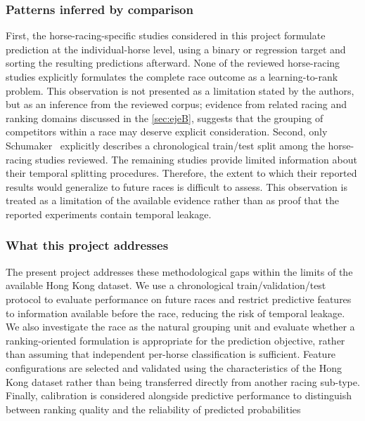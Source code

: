 \subsubsection*{\textbf{Patterns inferred by comparison}} First, the horse-racing-specific studies
considered in this project formulate prediction at the individual-horse level,
using a binary or regression target and sorting the resulting predictions
afterward. None of the reviewed horse-racing studies explicitly formulates the
complete race outcome as a learning-to-rank problem. This observation is not
presented as a limitation stated by the authors, but as an inference from the
reviewed corpus; evidence from related racing and ranking domains discussed in the
\ref{sec:ejeB}, suggests that the grouping of competitors within a race may deserve
explicit consideration. Second, only Schumaker~\cite{ejeA_schumaker2018} explicitly
describes a chronological train/test split among the horse-racing studies reviewed.
The remaining studies provide limited information about their temporal splitting
procedures. Therefore, the extent to which their reported results would generalize
to future races is difficult to assess. This observation is treated as a limitation
of the available evidence rather than as proof that the reported experiments contain
temporal leakage.

\subsubsection*{\textbf{What this project addresses}} The present project addresses these
methodological gaps within the limits of the available Hong Kong dataset. We
use a chronological train/validation/test protocol to evaluate performance on
future races and restrict predictive features to information available before
the race, reducing the risk of temporal leakage. We also investigate the race
as the natural grouping unit and evaluate whether a ranking-oriented
formulation is appropriate for the prediction objective, rather than assuming
that independent per-horse classification is sufficient. Feature
configurations are selected and validated using the characteristics of the
Hong Kong dataset rather than being transferred directly from another racing
sub-type. Finally, calibration is considered alongside predictive performance
to distinguish between ranking quality and the reliability of predicted
probabilities

